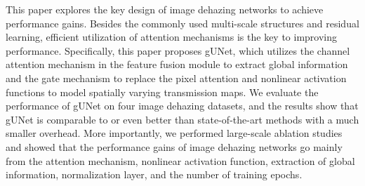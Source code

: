 \documentclass[10pt,twocolumn,letterpaper]{article}
\begin{document}
This paper explores the key design of image dehazing networks to achieve performance gains.
Besides the commonly used multi-scale structures and residual learning, efficient utilization of attention mechanisms is the key to improving performance.
Specifically, this paper proposes gUNet, which utilizes the channel attention mechanism in the feature fusion module to extract global information and the gate mechanism to replace the pixel attention and nonlinear activation functions to model spatially varying transmission maps.
We evaluate the performance of gUNet on four image dehazing datasets, and the results show that gUNet is comparable to or even better than state-of-the-art methods with a much smaller overhead.
More importantly, we performed large-scale ablation studies and showed that the performance gains of image dehazing networks go mainly from the attention mechanism, nonlinear activation function, extraction of global information, normalization layer, and the number of training epochs.




 
\newpage

{\small


}
\end{document}

